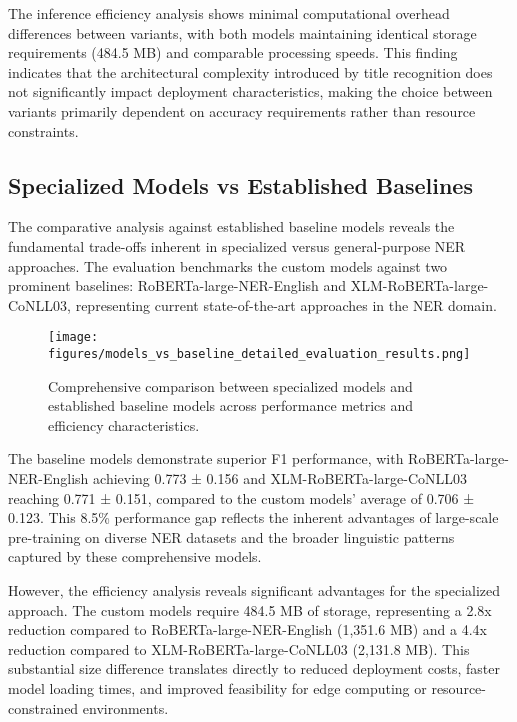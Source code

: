 \documentclass[a4paper]{usiinfbachelorproject}
\begin{document}
The inference efficiency analysis shows minimal computational overhead differences between variants, with both models maintaining identical storage requirements (484.5 MB) and comparable processing speeds. This finding indicates that the architectural complexity introduced by title recognition does not significantly impact deployment characteristics, making the choice between variants primarily dependent on accuracy requirements rather than resource constraints.

\subsection{Specialized Models vs Established Baselines}

The comparative analysis against established baseline models reveals the fundamental trade-offs inherent in specialized versus general-purpose NER approaches. The evaluation benchmarks the custom models against two prominent baselines: RoBERTa-large-NER-English and XLM-RoBERTa-large-CoNLL03, representing current state-of-the-art approaches in the NER domain.

\begin{figure}[H]
    \centering
    \texttt{[image: figures/models\_vs\_baseline\_detailed\_evaluation\_results.png]}
    \caption{Comprehensive comparison between specialized models and established baseline models across performance metrics and efficiency characteristics.}
    \label{fig:baseline_comparison}
\end{figure}

The baseline models demonstrate superior F1 performance, with RoBERTa-large-NER-English achieving 0.773 ± 0.156 and XLM-RoBERTa-large-CoNLL03 reaching 0.771 ± 0.151, compared to the custom models' average of 0.706 ± 0.123. This 8.5\% performance gap reflects the inherent advantages of large-scale pre-training on diverse NER datasets and the broader linguistic patterns captured by these comprehensive models.

However, the efficiency analysis reveals significant advantages for the specialized approach. The custom models require 484.5 MB of storage, representing a 2.8x reduction compared to RoBERTa-large-NER-English (1,351.6 MB) and a 4.4x reduction compared to XLM-RoBERTa-large-CoNLL03 (2,131.8 MB). This substantial size difference translates directly to reduced deployment costs, faster model loading times, and improved feasibility for edge computing or resource-constrained environments.
\end{document}
